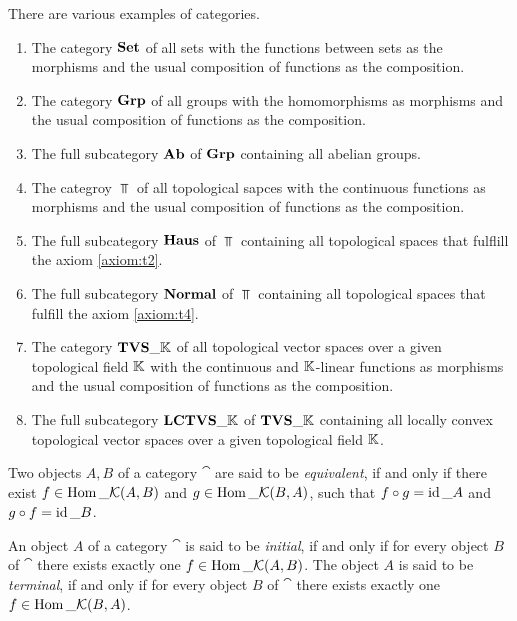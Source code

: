 \begin{example}
	There are various examples of categories. 
	\begin{enumerate}
		\item The category $\mathbf{Set}$ of all sets with the functions between sets as the morphisms and the usual composition of functions as the composition.
		
		\item The category $\mathbf{Grp}$ of all groups with the homomorphisms as morphisms and the usual composition of functions as the composition.
		
		\item The full subcategory $\mathbf{Ab}$ of $\mathbf{Grp}$ containing all abelian groups. 
		
		\item The categroy $\Top$ of all topological sapces with the continuous functions as morphisms and the usual composition of functions as the composition.
		
		\item The full subcategory $\mathbf{Haus}$ of $\Top$ containing all topological spaces that fulflill the axiom \ref{axiom:t2}. 
		
		\item The full subcategory $\mathbf{Normal}$ of $\Top$ containing all topological spaces that fulfill the axiom \ref{axiom:t4}. 
		
		\item The category $\mathbf{TVS}\_{\mathbb K}$ of all topological vector spaces over a given topological field $\mathbb K$ with the continuous and $\mathbb K$-linear functions as morphisms and the usual composition of functions as the composition.
		
		\item The full subcategory $\mathbf{LCTVS}\_{\mathbb K}$ of $\mathbf{TVS}\_{\mathbb K}$ containing all locally convex topological vector spaces over a given topological field $\mathbb K$.
	\end{enumerate}
\end{example}

\begin{definition}
	Two objects $A, B$ of a category $\cat$ are said to be \textit{equivalent}, if and only if there exist $f \in \operatorname{Hom}\_\mathcal K(A,B)$ and $g \in \operatorname{Hom}\_\mathcal K(B,A)$, such that $f \circ g = \operatorname{id}\_A$ and $g \circ f = \operatorname{id}\_B$. 
\end{definition}

\begin{definition}
	An object $A$ of a category $\cat$ is said to be \textit{initial}, if and only if for every object $B$ of $\cat$ there exists exactly one $f \in \operatorname{Hom}\_\mathcal K(A, B)$. The object $A$ is said to be \textit{terminal}, if and only if for every object $B$ of $\cat$ there exists exactly one $f \in \operatorname{Hom}\_\mathcal K(B, A)$.   
\end{definition}

